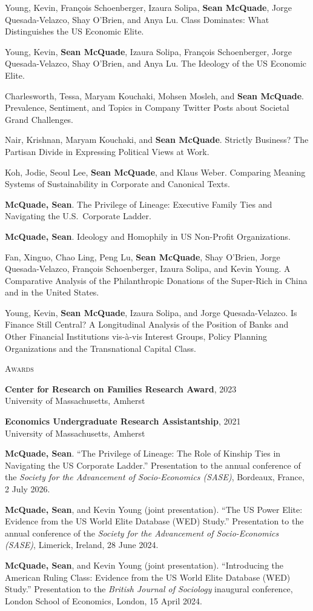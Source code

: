 \documentclass[11pt]{article}
\newcommand{\cvsection}[1]{%
  \vspace{8pt}\par
  \noindent
  \begin{minipage}[t]{1.25in}%
    {\small\textsc{#1}}%
  \end{minipage}\hspace{0.15in}%
  \begin{minipage}[t]{5.4in}%
}
\newcommand{\cvend}{%
  \end{minipage}\par%
}
\newcommand{\cvsectionflow}[1]{%
  \vspace{8pt}\par
  \leftskip=1.4in\relax
  \noindent
  \llap{\smash{\begin{minipage}[t]{1.25in}%
    {\small\textsc{#1}}%
  \end{minipage}}\hspace{0.15in}}%
  \ignorespaces
}
\newcommand{\cvendflow}{%
  \par\leftskip=0pt\relax
}
\newcommand{\bibfirst}{\hangindent=12pt\hangafter=1\relax\ignorespaces}
\newcommand{\bibnext}{\par\vspace{4pt}\hangindent=12pt\hangafter=1\noindent\ignorespaces}
\begin{document}
\cvsectionflow{Under Review}
\bibfirst
Young, Kevin, Fran\c{c}ois Schoenberger, Izaura Solipa, \textbf{Sean McQuade}, Jorge Quesada-Velazco, Shay O'Brien, and Anya Lu. Class Dominates: What Distinguishes the US Economic Elite.
\cvendflow

\cvsectionflow{In Progress}
\bibfirst
Young, Kevin, \textbf{Sean McQuade}, Izaura Solipa, Fran\c{c}ois Schoenberger, Jorge Quesada-Velazco, Shay O'Brien, and Anya Lu. The Ideology of the US Economic Elite.
\bibnext
Charlesworth, Tessa, Maryam Kouchaki, Mohsen Mosleh, and \textbf{Sean McQuade}. Prevalence, Sentiment, and Topics in Company Twitter Posts about Societal Grand Challenges.
\bibnext
Nair, Krishnan, Maryam Kouchaki, and \textbf{Sean McQuade}. Strictly Business? The Partisan Divide in Expressing Political Views at Work.
\bibnext
Koh, Jodie, Seoul Lee, \textbf{Sean McQuade}, and Klaus Weber. Comparing Meaning Systems of Sustainability in Corporate and Canonical Texts.
\bibnext
\textbf{McQuade, Sean}. The Privilege of Lineage: Executive Family Ties and Navigating the U.S.\ Corporate Ladder.
\bibnext
\textbf{McQuade, Sean}. Ideology and Homophily in US Non-Profit Organizations.
\bibnext
Fan, Xinguo, Chao Ling, Peng Lu, \textbf{Sean McQuade}, Shay O'Brien, Jorge Quesada-Velazco, Fran\c{c}ois Schoenberger, Izaura Solipa, and Kevin Young. A Comparative Analysis of the Philanthropic Donations of the Super-Rich in China and in the United States.
\bibnext
Young, Kevin, \textbf{Sean McQuade}, Izaura Solipa, and Jorge Quesada-Velazco. Is Finance Still Central? A Longitudinal Analysis of the Position of Banks and Other Financial Institutions vis-\`a-vis Interest Groups, Policy Planning Organizations and the Transnational Capital Class.
\cvendflow

\cvsection{Awards}
\textbf{Center for Research on Families Research Award}, 2023\\
\hspace*{12pt}University of Massachusetts, Amherst

\vspace{4pt}
\textbf{Economics Undergraduate Research Assistantship}, 2021\\
\hspace*{12pt}University of Massachusetts, Amherst
\cvend

\cvsectionflow{Conference\\Presentations}
\bibfirst
\textbf{McQuade, Sean}. ``The Privilege of Lineage: The Role of Kinship Ties in Navigating the US Corporate Ladder.'' Presentation to the annual conference of the \textit{Society for the Advancement of Socio-Economics (SASE)}, Bordeaux, France, 2 July 2026.
\bibnext
\textbf{McQuade, Sean}, and Kevin Young (joint presentation). ``The US Power Elite: Evidence from the US World Elite Database (WED) Study.'' Presentation to the annual conference of the \textit{Society for the Advancement of Socio-Economics (SASE)}, Limerick, Ireland, 28 June 2024.
\bibnext
\textbf{McQuade, Sean}, and Kevin Young (joint presentation). ``Introducing the American Ruling Class: Evidence from the US World Elite Database (WED) Study.'' Presentation to the \textit{British Journal of Sociology} inaugural conference, London School of Economics, London, 15 April 2024.
\cvendflow
\end{document}
